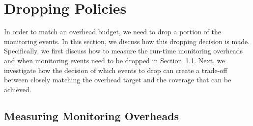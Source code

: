 \section{Dropping Policies}
\label{sec:policies}

In order to match an overhead budget, we need to drop a portion of the
monitoring events. In this section, we discuss how this dropping decision is
made. Specifically, we first discuss how to measure the run-time monitoring
overheads and when monitoring events need to be dropped in
Section~\ref{sec:policies.slack}. Next, we investigate how the decision of
which events to drop can create a trade-off between closely matching the
overhead target and the coverage that can be achieved.

\subsection{Measuring Monitoring Overheads}
\label{sec:policies.slack}

